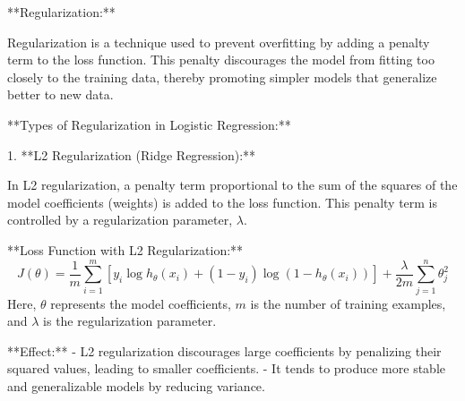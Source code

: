 **Regularization:**

Regularization is a technique used to prevent overfitting by adding a penalty term to the loss function. This penalty discourages the model from fitting too closely to the training data, thereby promoting simpler models that generalize better to new data.

**Types of Regularization in Logistic Regression:**

1. **L2 Regularization (Ridge Regression):**

   In L2 regularization, a penalty term proportional to the sum of the squares of the model coefficients (weights) is added to the loss function. This penalty term is controlled by a regularization parameter, \( \lambda \).

   **Loss Function with L2 Regularization:**
   \[
   J(\theta) = \frac{1}{m} \sum_{i=1}^m \left[ y_i \log h_\theta(x_i) + (1 - y_i) \log (1 - h_\theta(x_i)) \right] + \frac{\lambda}{2m} \sum_{j=1}^n \theta_j^2
   \]
   Here, \( \theta \) represents the model coefficients, \( m \) is the number of training examples, and \( \lambda \) is the regularization parameter.

   **Effect:**
   - L2 regularization discourages large coefficients by penalizing their squared values, leading to smaller coefficients.
   - It tends to produce more stable and generalizable models by reducing variance.


